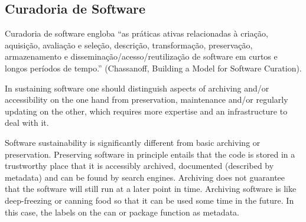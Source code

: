 \subsection{Curadoria de Software}

Curadoria de software engloba ``as práticas ativas relacionadas à criação, aquisição, avaliação e seleção, descrição, transformação, preservação, armazenamento e disseminação/acesso/reutilização de software em curtos e longos períodos de tempo.'' 
 (Chassanoff, Building a Model for Software Curation).


 In sustaining software one should distinguish aspects of archiving and/or accessibility on the one hand from preservation, maintenance and/or regularly updating on the other, which requires more expertise and an infrastructure to deal with it. 
 
 Software sustainability is significantly different from basic archiving or preservation. 
 Preserving software in principle entails that the code is stored in a trustworthy place that it is accessibly archived, documented (described by metadata) and can be found by search engines. 
 Archiving does not guarantee that the software will still run at a later point in time.
Archiving software is like deep-freezing or canning food so that it can be used some time in the future. In this case, the labels on the can or package function as metadata.



